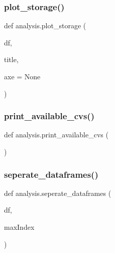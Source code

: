 \mbox{\label{namespaceanalysis_aa16091c7d73af16f02820451c7fc0e7b_aa16091c7d73af16f02820451c7fc0e7b}} 
\subsubsection{\texorpdfstring{plot\+\_\+storage()}{plot\_storage()}}
{\footnotesize\ttfamily def analysis.\+plot\+\_\+storage (\begin{DoxyParamCaption}\item[{}]{df,  }\item[{}]{title,  }\item[{}]{axe = {\ttfamily None} }\end{DoxyParamCaption})}

\mbox{\label{namespaceanalysis_a5f85d3f13b078c21b4e1c2008de0978b_a5f85d3f13b078c21b4e1c2008de0978b}} 
\subsubsection{\texorpdfstring{print\+\_\+available\+\_\+cvs()}{print\_available\_cvs()}}
{\footnotesize\ttfamily def analysis.\+print\+\_\+available\+\_\+cvs (\begin{DoxyParamCaption}{ }\end{DoxyParamCaption})}

\mbox{\label{namespaceanalysis_a2d283e765d037acc5b1405e3ddc5b5c6_a2d283e765d037acc5b1405e3ddc5b5c6}} 
\subsubsection{\texorpdfstring{seperate\+\_\+dataframes()}{seperate\_dataframes()}}
{\footnotesize\ttfamily def analysis.\+seperate\+\_\+dataframes (\begin{DoxyParamCaption}\item[{}]{df,  }\item[{}]{max\+Index }\end{DoxyParamCaption})}



